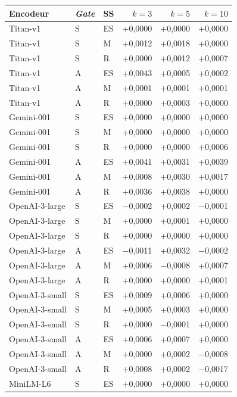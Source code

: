 \documentclass[a4paper,10pt]{article}
\begin{document}
\begin{table}[p]
\centering
\small
\begin{tabular}{lllrrr}
\toprule
Encodeur & \textit{Gate} & SS & $k=3$ & $k=5$ & $k=10$ \\
\midrule
Titan-v1 & S & ES & +0,0000 & +0,0000 & +0,0000 \\
Titan-v1 & S & M & +0,0012 & +0,0018 & +0,0000 \\
Titan-v1 & S & R & +0,0000 & +0,0012 & +0,0007 \\
Titan-v1 & A & ES & +0,0043 & +0,0005 & +0,0002 \\
Titan-v1 & A & M & +0,0001 & +0,0001 & +0,0001 \\
Titan-v1 & A & R & +0,0000 & +0,0003 & +0,0000 \\
\midrule
Gemini-001 & S & ES & +0,0000 & +0,0000 & +0,0000 \\
Gemini-001 & S & M & +0,0000 & +0,0000 & +0,0000 \\
Gemini-001 & S & R & +0,0000 & +0,0000 & +0,0006 \\
Gemini-001 & A & ES & +0,0041 & +0,0031 & +0,0039 \\
Gemini-001 & A & M & +0,0008 & +0,0030 & +0,0017 \\
Gemini-001 & A & R & +0,0036 & +0,0038 & +0,0000 \\
\midrule
OpenAI-3-large & S & ES & $-$0,0002 & +0,0002 & $-$0,0001 \\
OpenAI-3-large & S & M & +0,0000 & +0,0001 & +0,0000 \\
OpenAI-3-large & S & R & +0,0000 & +0,0000 & +0,0000 \\
OpenAI-3-large & A & ES & $-$0,0011 & +0,0032 & $-$0,0002 \\
OpenAI-3-large & A & M & +0,0006 & $-$0,0008 & +0,0007 \\
OpenAI-3-large & A & R & +0,0000 & +0,0000 & +0,0001 \\
\midrule
OpenAI-3-small & S & ES & +0,0009 & +0,0006 & +0,0000 \\
OpenAI-3-small & S & M & +0,0005 & +0,0003 & +0,0000 \\
OpenAI-3-small & S & R & +0,0000 & $-$0,0001 & +0,0000 \\
OpenAI-3-small & A & ES & +0,0006 & +0,0007 & +0,0000 \\
OpenAI-3-small & A & M & +0,0000 & +0,0002 & $-$0,0008 \\
OpenAI-3-small & A & R & +0,0008 & +0,0002 & $-$0,0017 \\
\midrule
MiniLM-L6 & S & ES & +0,0000 & +0,0000 & +0,0000 \\

\end{tabular}
\end{table}
\end{document}

